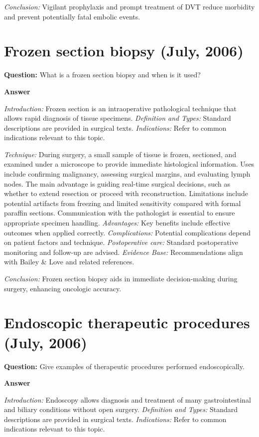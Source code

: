 \documentclass{article}
\begin{document}
\emph{Conclusion:} Vigilant prophylaxis and prompt treatment of DVT reduce morbidity and prevent potentially fatal embolic events.


\section{Frozen section biopsy (July, 2006)}

\textbf{Question:} What is a frozen section biopsy and when is it used?

\textbf{Answer}

\emph{Introduction:} Frozen section is an intraoperative pathological technique that allows rapid diagnosis of tissue specimens.
\emph{Definition and Types:} Standard descriptions are provided in surgical texts.
\emph{Indications:} Refer to common indications relevant to this topic.

\emph{Technique:} During surgery, a small sample of tissue is frozen, sectioned, and examined under a microscope to provide immediate histological information. Uses include confirming malignancy, assessing surgical margins, and evaluating lymph nodes. The main advantage is guiding real-time surgical decisions, such as whether to extend resection or proceed with reconstruction. Limitations include potential artifacts from freezing and limited sensitivity compared with formal paraffin sections. Communication with the pathologist is essential to ensure appropriate specimen handling.
\emph{Advantages:} Key benefits include effective outcomes when applied correctly.
\emph{Complications:} Potential complications depend on patient factors and technique.
\emph{Postoperative care:} Standard postoperative monitoring and follow-up are advised.
\emph{Evidence Base:} Recommendations align with Bailey & Love and related references.

\emph{Conclusion:} Frozen section biopsy aids in immediate decision-making during surgery, enhancing oncologic accuracy.


\section{Endoscopic therapeutic procedures (July, 2006)}

\textbf{Question:} Give examples of therapeutic procedures performed endoscopically.

\textbf{Answer}

\emph{Introduction:} Endoscopy allows diagnosis and treatment of many gastrointestinal and biliary conditions without open surgery.
\emph{Definition and Types:} Standard descriptions are provided in surgical texts.
\emph{Indications:} Refer to common indications relevant to this topic.
\end{document}
